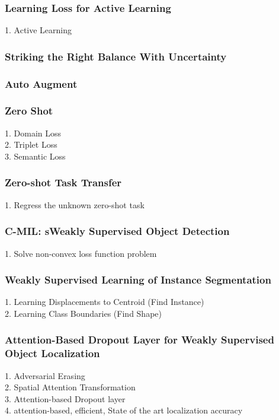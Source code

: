 \subsubsection{Learning Loss for Active Learning }
    1. Active Learning \\
\subsubsection{Striking the Right Balance With Uncertainty}
\subsubsection{Auto Augment}
\subsubsection{Zero Shot}
    1. Domain Loss \\
    2. Triplet Loss \\
    3. Semantic Loss \\
\subsubsection{Zero-shot Task Transfer}
    1. Regress the unknown zero-shot task \\
\subsubsection{C-MIL: sWeakly Supervised Object Detection}
    1. Solve non-convex loss function problem \\
\subsubsection{Weakly Supervised Learning of Instance Segmentation}
    1. Learning Displacements to Centroid (Find Instance) \\
    2. Learning Class Boundaries (Find Shape) \\
\subsubsection{Attention-Based Dropout Layer for Weakly Supervised Object Localization}
    1. Adversarial Erasing \\
    2. Spatial Attention Transformation \\
    3. Attention-based Dropout layer \\
    4. attention-based, efficient, State of the art localization accuracy \\
